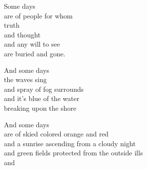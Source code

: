 \documentclass{article}
\begin{document}
        Some days \\
        are of people for whom \\
        truth \\
        and thought \\
        and any will to see \\
        are buried and gone.

        \bigskip

        And some days \\
        the waves sing \\
        and spray of fog surrounds \\
        and it's blue of the water \\
        breaking upon the shore

        And some days \\
        are of skied colored orange and red \\
        and a sunrise ascending from a cloudy night \\
        and green fields protected from the outside ills \\
        and

    \pagebreak
\end{document}
